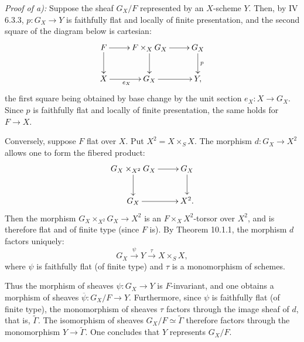 \emph{Proof of a):} Suppose the \fppf sheaf $G_X/F$ represented by an $X$-scheme $Y$. Then, by IV 6.3.3, $p:G_X\to Y$ is faithfully flat and locally of finite presentation, and the second square of the diagram below is cartesian:
\[
\xymatrix{F\ar[r]\ar[d]&F\times_XG_X\ar[r]\ar[d]&G_X\ar[d]^p\\X\ar[r]_{e_X}&G_X\ar[r]&Y,}
\]
the first square being obtained by base change by the unit section $e_X:X\to G_X$. Since $p$ is faithfully flat and locally of finite presentation, the same holds for $F\to X$.

Conversely, suppose $F$ flat over $X$. Put $X^2=X\times_SX$. The morphism $d:G_X\to X^2$ allows one to form the fibered product:
\[
\xymatrix{G_X\times_{X^2}G_X\ar[r]\ar[d]&G_X\ar[d]\\G_X\ar[r]&X^2.}
\]
Then the morphism $G_X\times_{X^2}G_X\to X^2$ is an $F\times_XX^2$-torsor over $X^2$, and is therefore flat and of finite type (since $F$ is). By Theorem 10.1.1, the morphism $d$ factors uniquely:
\[
G_X\xrightarrow{\psi}Y\xrightarrow{\tau}X\times_SX,
\]
where $\psi$ is faithfully flat (of finite type) and $\tau$ is a monomorphism of schemes.

Thus the morphism of sheaves $\psi:G_X\to Y$ is $F$-invariant, and one obtains a morphism of sheaves $\overline\psi:G_X/F\to Y$. Furthermore, since $\psi$ is faithfully flat (of finite type), the monomorphism of sheaves $\tau$ factors through the image sheaf of $d$, that is, $\widetilde\Gamma$. The isomorphism of sheaves $G_X/F\simeq\widetilde\Gamma$ therefore factors through the monomorphism $Y\to\widetilde\Gamma$. One concludes that $Y$ represents $G_X/F$.

